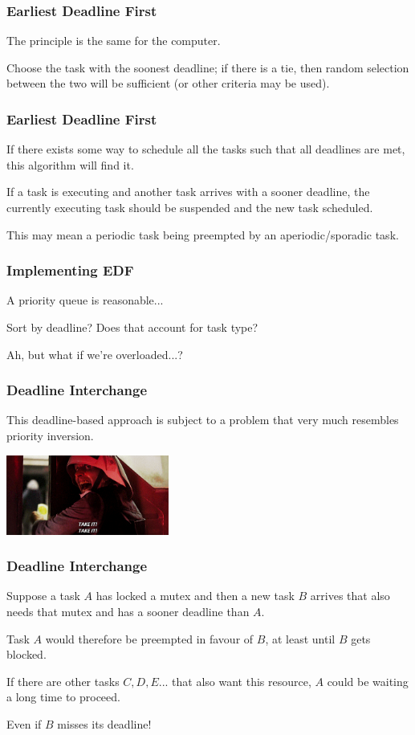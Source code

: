 \begin{frame}
\frametitle{Earliest Deadline First}

The principle is the same for the computer. 

Choose the task with the soonest deadline; if there is a tie, then random selection between the two will be sufficient (or other criteria may be used). 

\end{frame}

\begin{frame}
\frametitle{Earliest Deadline First}

If there exists some way to schedule all the tasks such that all deadlines are met, this algorithm will find it. 

If a task is executing and another task arrives with a sooner deadline, the currently executing task should be suspended and the new task scheduled. 

This may mean a periodic task being preempted by an aperiodic/sporadic task.

\end{frame}

\begin{frame}
\frametitle{Implementing EDF}

A priority queue is reasonable...

Sort by deadline? Does that account for task type?

Ah, but what if we're overloaded...?

\end{frame}

\begin{frame}
\frametitle{Deadline Interchange}

This deadline-based approach is subject to a problem that very much resembles priority inversion.

\begin{center}
	\includegraphics[width=0.4\textwidth]{images/takeit.jpg}
\end{center}

\end{frame}

\begin{frame}
\frametitle{Deadline Interchange}
Suppose a task $A$ has locked a mutex and then a new task $B$ arrives that also needs that mutex and has a sooner deadline than $A$. 

Task $A$ would therefore be preempted in favour of $B$, at least until $B$ gets blocked. 

If there are other tasks $C, D, E$... that also want this resource, $A$ could be waiting a long time to proceed.

Even if $B$ misses its deadline!

\end{frame}


